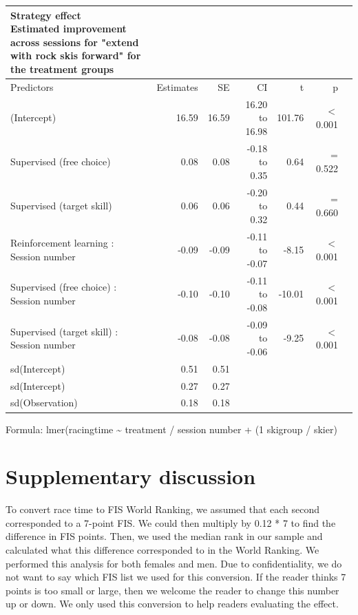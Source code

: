 \documentclass[pdflatex,sn-mathphys-num]{sn-jnl}%
\theoremstyle{thmstyleone}%
\theoremstyle{thmstyletwo}%
\theoremstyle{thmstylethree}%
\begin{document}
\begin{appendices}
\setlength{\LTpost}{0mm}
\begin{longtable}{lrrrrrl}
\caption*{
{\large Strategy effect} \\ 
{\small Estimated improvement across sessions for "extend with rock skis forward" for the treatment groups}
} \\ 
\toprule
Predictors & Estimates & SE & CI & t & p \\
\midrule\addlinespace[2.5pt]
(Intercept) & 16.59 & 16.59 & 16.20 to 16.98 & 101.76 &  $<$ 0.001 \\ 
Supervised (free choice) & 0.08 & 0.08 & -0.18 to 0.35 & 0.64 &  =  0.522 \\ 
Supervised (target skill) & 0.06 & 0.06 & -0.20 to 0.32 & 0.44 &  =  0.660 \\ 
Reinforcement learning : Session number & -0.09 & -0.09 & -0.11 to -0.07 & -8.15 &  $<$  0.001 \\ 
Supervised (free choice) : Session number & -0.10 & -0.10 & -0.11 to -0.08 & -10.01 &  $<$  0.001 \\ 
Supervised (target skill) : Session number & -0.08 & -0.08 & -0.09 to -0.06 & -9.25 &  $<$  0.001 \\ 
sd(Intercept) & 0.51 & 0.51 &  &  &  &  \\ 
sd(Intercept) & 0.27 & 0.27 &  &  &  &  \\ 
sd(Observation) & 0.18 & 0.18 &  &  &  &  \\ 
\bottomrule
\end{longtable}
\begin{minipage}{\linewidth}
Formula: lmer(racingtime \textasciitilde{} treatment / session number  + (1  \textbar{} skigroup / skier)\\
\end{minipage}

\section{Supplementary discussion}\label{supdiscussion}
To convert race time to FIS World Ranking, we assumed that each second corresponded to a 7-point FIS. We could then multiply by 0.12 * 7 to find the difference in FIS points. Then, we used the median rank in our sample and calculated what this difference corresponded to in the World Ranking. We performed this analysis for both females and men. Due to confidentiality, we do not want to say which FIS list we used for this conversion. If the reader thinks 7 points is too small or large, then we welcome the reader to change this number up or down. We only used this conversion to help readers evaluating the effect. 










\end{appendices}
\end{document}
